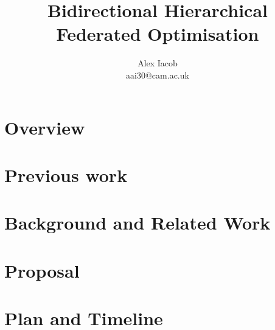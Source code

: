 \documentclass{article}
\title{\Large Bidirectional Hierarchical Federated Optimisation}
\author{
  Alex Iacob \\
  \texttt\small{aai30@cam.ac.uk} \\
}
\begin{document}
\maketitle
\vspace{-0.5cm}
% 
\section{Overview}

\section{Previous work}

\section{Background and Related Work}

\section{Proposal}


\section{Plan and Timeline}



{\scriptsize
  }

\clearpage

\appendix
% 
\end{document}
